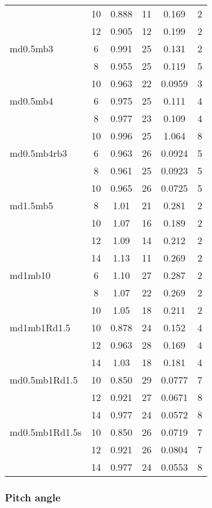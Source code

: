 \begin{table*}
\begin{center}
\begin{tabular}{lccccc}
           & 10 & 0.888 & 11 & 0.169 & 2 \\
           & 12 & 0.905 & 12 & 0.199 & 2 \\
md0.5mb3   & 6 & 0.991 & 25 & 0.131 & 2 \\
           & 8 & 0.955 & 25 & 0.119 & 5 \\
           & 10 & 0.963  & 22 & 0.0959 & 3 \\
md0.5mb4   & 6 & 0.975 & 25 & 0.111 & 4 \\
           & 8 & 0.977 & 23 & 0.109 & 4 \\
           & 10 & 0.996 & 25 & 1.064 & 8 \\
md0.5mb4rb3 & 6 & 0.963 & 26 & 0.0924 & 5 \\
            & 8 & 0.961 & 25 & 0.0923 & 5 \\
            & 10 & 0.965 & 26 & 0.0725 & 5 \\
md1.5mb5   & 8 & 1.01 & 21 & 0.281 & 2 \\
           & 10 & 1.07 & 16 & 0.189 & 2 \\
           & 12 & 1.09 & 14 & 0.212 & 2 \\
           & 14 & 1.13 & 11 & 0.269 & 2 \\
md1mb10    & 6 & 1.10 & 27 & 0.287 & 2 \\
           & 8 & 1.07 & 22 & 0.269 & 2 \\
           & 10 & 1.05 & 18 & 0.211 & 2 \\
md1mb1Rd1.5   & 10 & 0.878 & 24 & 0.152 & 4 \\
           & 12 & 0.963 & 28 & 0.169 & 4 \\
           & 14 & 1.03 & 18 & 0.181 & 4 \\
md0.5mb1Rd1.5 & 10 & 0.850 & 29 & 0.0777 & 7 \\
           & 12 & 0.921 & 27 & 0.0671 & 8 \\
           & 14 & 0.977 & 24 & 0.0572 & 8 \\
md0.5mb1Rd1.5s & 10 & 0.850 & 26 & 0.0719 & 7 \\
           & 12 & 0.921 & 26 & 0.0804 & 7 \\
           & 14 & 0.977 & 24 & 0.0553 & 8 \\
\hline
\end{tabular}
\end{center}
\end{table*}


\subsubsection{Pitch angle}

